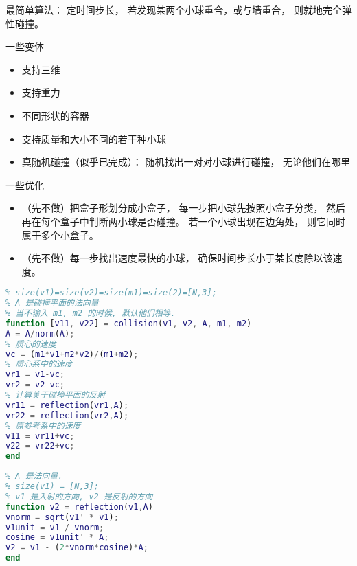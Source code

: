 
\begin{issues}
\issueDraft
\end{issues}


最简单算法： 定时间步长， 若发现某两个小球重合，或与墙重合， 则就地完全弹性碰撞。

一些变体
\begin{itemize}
\item 支持三维
\item 支持重力
\item 不同形状的容器
\item 支持质量和大小不同的若干种小球
\item 真随机碰撞（似乎已完成）： 随机找出一对对小球进行碰撞， 无论他们在哪里
\end{itemize}

一些优化
\begin{itemize}
\item （先不做）把盒子形划分成小盒子， 每一步把小球先按照小盒子分类， 然后再在每个盒子中判断两小球是否碰撞。 若一个小球出现在边角处， 则它同时属于多个小盒子。
\item （先不做）每一步找出速度最快的小球， 确保时间步长小于某长度除以该速度。
\end{itemize}

\begin{lstlisting}[language=matlab]
% 两个粒子的完全弹性碰撞
% size(v1)=size(v2)=size(m1)=size(2)=[N,3];
% A 是碰撞平面的法向量
% 当不输入 m1, m2 的时候, 默认他们相等.
function [v11, v22] = collision(v1, v2, A, m1, m2)
A = A/norm(A);
% 质心的速度
vc = (m1*v1+m2*v2)/(m1+m2);
% 质心系中的速度
vr1 = v1-vc;
vr2 = v2-vc;
% 计算关于碰撞平面的反射
vr11 = reflection(vr1,A);
vr22 = reflection(vr2,A);
% 原参考系中的速度
v11 = vr11+vc;
v22 = vr22+vc;
end
\end{lstlisting}

\begin{lstlisting}[language=matlab]
% 反射
% A 是法向量. 
% size(v1) = [N,3];
% v1 是入射的方向, v2 是反射的方向
function v2 = reflection(v1,A)
vnorm = sqrt(v1' * v1);
v1unit = v1 / vnorm;
cosine = v1unit' * A;
v2 = v1 - (2*vnorm*cosine)*A;
end
\end{lstlisting}

